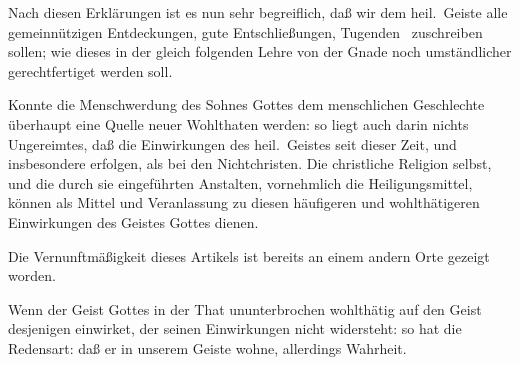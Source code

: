 \begin{aufza}
\begin{aufzb}
\end{aufzb}
\item Nach diesen Erklärungen ist es nun sehr begreiflich, daß wir dem heil.\ Geiste alle gemeinnützigen Entdeckungen, gute Entschließungen, Tugenden \usw\ zuschreiben sollen; wie dieses in der gleich folgenden Lehre von der Gnade noch umständlicher gerechtfertiget werden soll.
\item Konnte die Menschwerdung des Sohnes Gottes dem menschlichen Geschlechte überhaupt eine Quelle neuer Wohlthaten werden: so liegt auch darin nichts Ungereimtes, daß die Einwirkungen des heil.\ Geistes seit dieser Zeit, und insbesondere  erfolgen, als bei den Nichtchristen. Die christliche Religion selbst, und die durch sie eingeführten Anstalten, vornehmlich die Heiligungsmittel, können als Mittel und Veranlassung zu diesen häufigeren und wohlthätigeren Einwirkungen des Geistes Gottes dienen.
\item Die Vernunftmäßigkeit dieses Artikels ist bereits an einem andern Orte gezeigt worden.
\item Wenn der Geist Gottes in der That ununterbrochen wohlthätig auf den Geist desjenigen einwirket, der seinen Einwirkungen nicht widersteht: so hat die Redensart: daß er in unserem Geiste wohne, allerdings Wahrheit.
\end{aufza}

